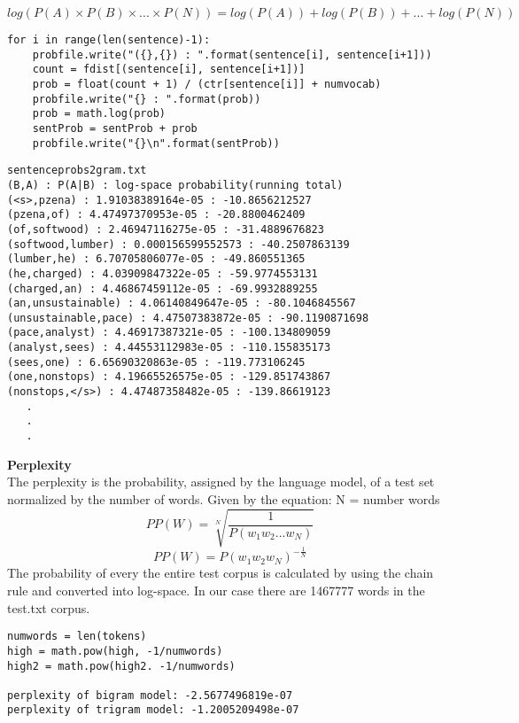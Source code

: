 \documentclass{article}
\begin{document}
\begin{equation}
log(P(A) \times P(B) \times ... \times P(N)) = log(P(A)) + log(P(B)) + ... + log(P(N))
\end{equation}
\begin{verbatim}
for i in range(len(sentence)-1):
    probfile.write("({},{}) : ".format(sentence[i], sentence[i+1]))
    count = fdist[(sentence[i], sentence[i+1])]
    prob = float(count + 1) / (ctr[sentence[i]] + numvocab)
    probfile.write("{} : ".format(prob))
    prob = math.log(prob)
    sentProb = sentProb + prob
    probfile.write("{}\n".format(sentProb))
\end{verbatim}
\begin{verbatim}
sentenceprobs2gram.txt
(B,A) : P(A|B) : log-space probability(running total)
(<s>,pzena) : 1.91038389164e-05 : -10.8656212527
(pzena,of) : 4.47497370953e-05 : -20.8800462409
(of,softwood) : 2.46947116275e-05 : -31.4889676823
(softwood,lumber) : 0.000156599552573 : -40.2507863139
(lumber,he) : 6.70705806077e-05 : -49.860551365
(he,charged) : 4.03909847322e-05 : -59.9774553131
(charged,an) : 4.46867459112e-05 : -69.9932889255
(an,unsustainable) : 4.06140849647e-05 : -80.1046845567
(unsustainable,pace) : 4.47507383872e-05 : -90.1190871698
(pace,analyst) : 4.46917387321e-05 : -100.134809059
(analyst,sees) : 4.44553112983e-05 : -110.155835173
(sees,one) : 6.65690320863e-05 : -119.773106245
(one,nonstops) : 4.19665526575e-05 : -129.851743867
(nonstops,</s>) : 4.47487358482e-05 : -139.86619123
   .
   .
   .
\end{verbatim}
\textbf{Perplexity}\\
The perplexity is the probability, assigned by the language model, of a test set normalized by the number of words. Given by the equation: N = number words
\begin{equation}
PP(W) = \sqrt[N]{\frac{1}{P(w_{1}w_{2}...w_{N})}}
\end{equation} 
\begin{equation}
PP(W) = P(w_{1}w_{2}w_{N})^{-\frac{1}{N}}
\end{equation}
The probability of every the entire test corpus is calculated by using the chain rule and converted into log-space. In our case there are 1467777 words in the test.txt corpus.
\begin{verbatim}
numwords = len(tokens)
high = math.pow(high, -1/numwords)
high2 = math.pow(high2. -1/numwords)

perplexity of bigram model: -2.5677496819e-07
perplexity of trigram model: -1.2005209498e-07
\end{verbatim}
\end{document}
